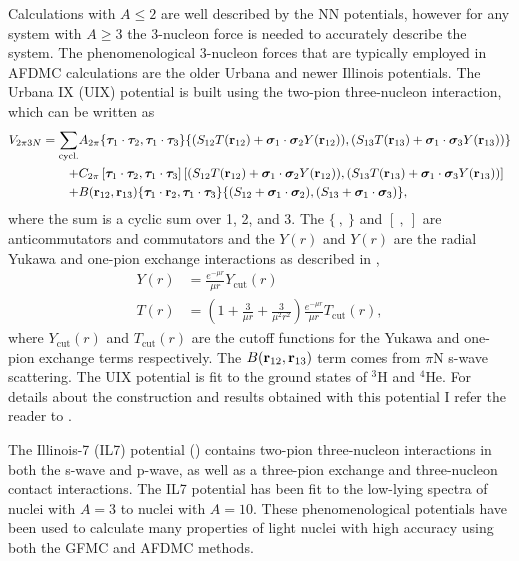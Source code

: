Calculations with $A\le2$ are well described by the NN potentials, however for any system with $A\ge3$ the 3-nucleon force is needed to accurately describe the system. The phenomenological 3-nucleon forces that are typically employed in AFDMC calculations are the older Urbana and newer Illinois potentials. The Urbana IX (UIX) potential is built using the two-pion three-nucleon interaction, which can be written as
\begin{equation}
\begin{split}
   V_{2\pi3N} = \sum\limits_\text{cycl.} &A_{2\pi}\{\bm{\tau}_1\cdot\bm{\tau}_2,\bm{\tau}_1\cdot\bm{\tau}_3\} \{(S_{12}T(\mathbf{r}_{12})+\bm{\sigma}_1\cdot\bm{\sigma}_2 Y(\mathbf{r}_{12})),(S_{13}T(\mathbf{r}_{13})+\bm{\sigma}_1\cdot\bm{\sigma}_3 Y(\mathbf{r}_{13}))\} \\
      + &C_{2\pi}\left[\bm{\tau}_1\cdot\bm{\tau}_2,\bm{\tau}_1\cdot\bm{\tau}_3\right] \left[(S_{12}T(\mathbf{r}_{12})+\bm{\sigma}_1\cdot\bm{\sigma}_2 Y(\mathbf{r}_{12})),(S_{13}T(\mathbf{r}_{13})+\bm{\sigma}_1\cdot\bm{\sigma}_3 Y(\mathbf{r}_{13}))\right] \\
      + &B(\mathbf{r}_{12},\mathbf{r}_{13})\{\bm{\tau}_1\cdot\mathbf{r}_2,\bm{\tau}_1\cdot\bm{\tau}_3\}\{(S_{12}+\bm{\sigma}_1\cdot\bm{\sigma}_2),(S_{13}+\bm{\sigma}_1\cdot\bm{\sigma}_3)\},
\end{split}
\end{equation}
where the sum is a cyclic sum over 1, 2, and 3. The $\{~,~\}$ and $[~,~]$ are anticommutators and commutators and the $Y(r)$ and $Y(r)$ are the radial Yukawa and one-pion exchange interactions as described in \cite{carlson1983},
\begin{align}
   Y(r) &= \frac{e^{-\mu r}}{\mu r} Y_\text{cut}(r) \\
   T(r) &= \left(1+\frac{3}{\mu r} + \frac{3}{\mu^2 r^2}\right)\frac{e^{-\mu r}}{\mu r} T_\text{cut}(r),
\end{align}
where $Y_\text{cut}(r)$ and $T_\text{cut}(r)$ are the cutoff functions for the Yukawa and one-pion exchange terms respectively. The $B(\mathbf{r}_{12},\mathbf{r}_{13})$ term comes from $\pi$N s-wave scattering. The UIX potential is fit to the ground states of $^3$H and $^4$He. For details about the construction and results obtained with this potential I refer the reader to \cite{carlson1983, pudliner1996, pudliner1997}.

The Illinois-7 (IL7) potential (\cite{pieper2001}) contains two-pion three-nucleon interactions in both the s-wave and p-wave, as well as a three-pion exchange and three-nucleon contact interactions. The IL7 potential has been fit to the low-lying spectra of nuclei with $A=3$ to nuclei with $A=10$. These phenomenological potentials have been used to calculate many properties of light nuclei with high accuracy using both the GFMC and AFDMC methods.

